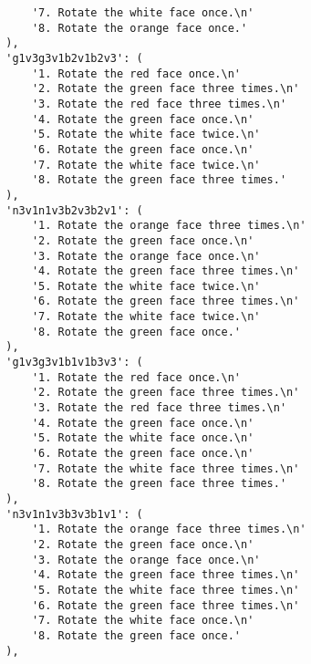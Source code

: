 \begin{lstlisting}
            '7. Rotate the white face once.\n'
            '8. Rotate the orange face once.'
        ),
        'g1v3g3v1b2v1b2v3': (
            '1. Rotate the red face once.\n'
            '2. Rotate the green face three times.\n'
            '3. Rotate the red face three times.\n'
            '4. Rotate the green face once.\n'
            '5. Rotate the white face twice.\n'
            '6. Rotate the green face once.\n'
            '7. Rotate the white face twice.\n'
            '8. Rotate the green face three times.'
        ),
        'n3v1n1v3b2v3b2v1': (
            '1. Rotate the orange face three times.\n'
            '2. Rotate the green face once.\n'
            '3. Rotate the orange face once.\n'
            '4. Rotate the green face three times.\n'
            '5. Rotate the white face twice.\n'
            '6. Rotate the green face three times.\n'
            '7. Rotate the white face twice.\n'
            '8. Rotate the green face once.'
        ),
        'g1v3g3v1b1v1b3v3': (
            '1. Rotate the red face once.\n'
            '2. Rotate the green face three times.\n'
            '3. Rotate the red face three times.\n'
            '4. Rotate the green face once.\n'
            '5. Rotate the white face once.\n'
            '6. Rotate the green face once.\n'
            '7. Rotate the white face three times.\n'
            '8. Rotate the green face three times.'
        ),
        'n3v1n1v3b3v3b1v1': (
            '1. Rotate the orange face three times.\n'
            '2. Rotate the green face once.\n'
            '3. Rotate the orange face once.\n'
            '4. Rotate the green face three times.\n'
            '5. Rotate the white face three times.\n'
            '6. Rotate the green face three times.\n'
            '7. Rotate the white face once.\n'
            '8. Rotate the green face once.'
        ),
        

\end{lstlisting}
